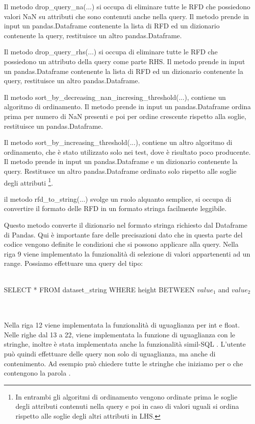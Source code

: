 Il metodo drop{\_}query{\_}na(...) si occupa di eliminare tutte le RFD che possiedono valori NaN su attributi che sono contenuti anche nella query. Il metodo prende in input un pandas.Dataframe contenente la lista di RFD ed un dizionario contenente la query, restituisce un altro pandas.Dataframe.

Il metodo drop{\_}query{\_}rhs(...) si occupa di eliminare tutte le RFD che possiedono un attributo della query come parte RHS. Il metodo prende in input un pandas.Dataframe contenente la lista di RFD ed un dizionario contenente la query, restituisce un altro pandas.Dataframe.

Il metodo sort{\_}by{\_}decreasing{\_}nan{\_}incresing{\_}threshold(...), contiene un algoritmo di ordinamento. Il metodo prende in input un pandas.Dataframe ordina prima per numero di NaN presenti e poi per ordine crescente rispetto alla soglie, restituisce un pandas.Dataframe.

Il metodo sort{\_}by{\_}increasing{\_}threshold(...), contiene un altro algoritmo di ordinamento, che è stato utilizzato solo nei test, dove è risultato poco producente. Il metodo prende in input un pandas.Dataframe e un dizionario contenente la query. Restitusce un altro pandas.Dataframe ordinato solo rispetto alle soglie degli attributi \footnote{In entrambi gli algoritmi di ordinamento vengono ordinate prima le soglie degli attributi contenuti nella query e poi in caso di valori uguali si ordina rispetto alle soglie degli altri attributi in LHS.}.

il metodo rfd{\_}to{\_}string(...) svolge un ruolo alquanto semplice, si occupa di convertire il formato delle RFD in un formato stringa facilmente leggibile.

Questo metodo converte il dizionario nel formato stringa richiesto dal Dataframe di Pandas.
Qui è importante fare delle precisazioni dato che in  questa parte del codice vengono definite le condizioni che si possono applicare alla query.
Nella riga 9 viene implementato la funzionalità di selezione di valori appartenenti ad un range. Possiamo effettuare una query del tipo:
\\~\\
\centerline{SELECT * FROM dataset{\_}string WHERE height BETWEEN $value_1$ and $value_2$}
\\~\\
Nella riga 12 viene implementata la funzionalità di uguaglianza per int e float.
Nelle righe dal 13 a 22, viene implementata la funzione di uguaglianza con le stringhe, inoltre è stata implementata anche la funzionalità simil-SQL . L'utente può quindi effettuare delle query non solo di uguaglianza, ma anche di contenimento. Ad esempio può chiedere tutte le stringhe che iniziamo per  o che contengono la parola .

